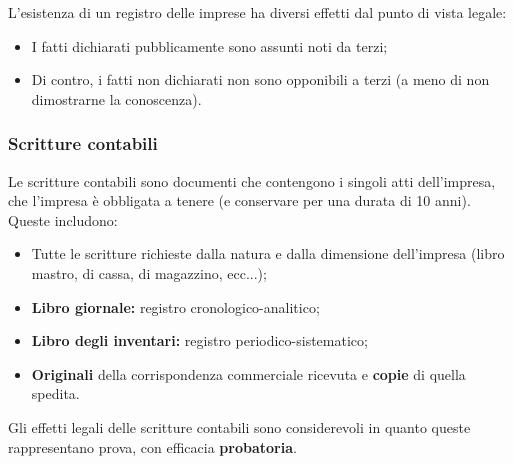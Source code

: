 \documentclass[a4paper,11pt]{article}
\begin{document}
L'esistenza di un registro delle imprese ha diversi effetti dal punto di vista legale:
\begin{itemize}
	\item I fatti dichiarati pubblicamente sono assunti noti da terzi;
	\item Di contro, i fatti non dichiarati non sono opponibili a terzi (a meno di non dimostrarne la conoscenza).
\end{itemize}

\subsubsection{Scritture contabili}
Le scritture contabili sono documenti che contengono i singoli atti dell'impresa, che l'impresa è obbligata a tenere (e conservare per una durata di 10 anni).
Queste includono:
\begin{itemize}
	\item Tutte le scritture richieste dalla natura e dalla dimensione dell'impresa (libro mastro, di cassa, di magazzino, ecc...);
	\item \textbf{Libro giornale:} registro cronologico-analitico;
	\item \textbf{Libro degli inventari:} registro periodico-sistematico;
	\item \textbf{Originali} della corrispondenza commerciale ricevuta e \textbf{copie} di quella spedita.
\end{itemize}

Gli effetti legali delle scritture contabili sono considerevoli in quanto queste rappresentano prova, con efficacia \textbf{probatoria}.
\end{document}
